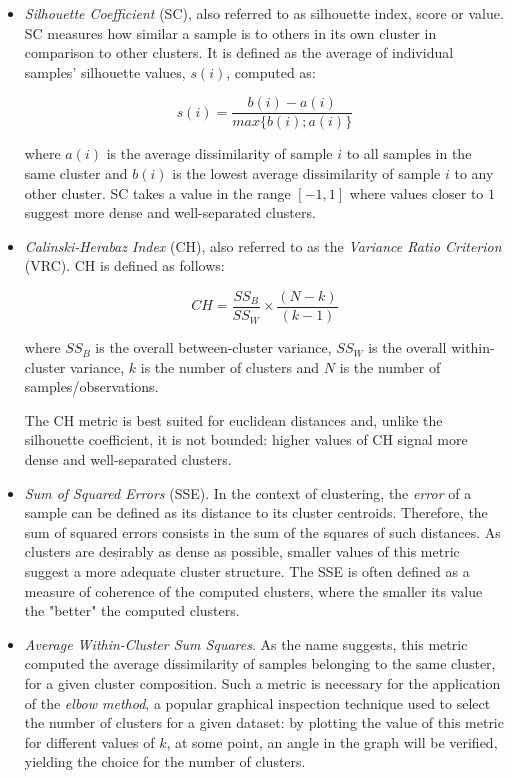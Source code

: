 \documentclass[9pt,journal,compsoc]{IEEEtran}
\begin{document}
\begin{itemize}
	\item \emph{Silhouette Coefficient} (SC), also referred to as silhouette index, score or value. SC measures how similar a sample is to others in its own cluster in comparison to other clusters. It is defined as the average of individual samples' silhouette values, $s(i)$, computed as:
	
	$$s(i) = \frac{b(i) - a(i)}{max\{b(i); a(i)\}} $$
	
	where $a(i)$ is the average dissimilarity of sample $i$ to all samples in the same cluster and $b(i)$ is the lowest average dissimilarity of sample $i$ to any other cluster. SC takes a value in the range $[-1, 1]$ where values closer to $1$ suggest more dense and well-separated clusters.
	
	\vspace{0.3cm}
	
	\item \emph{Calinski-Herabaz Index} (CH), also referred to as the \emph{Variance Ratio Criterion} (VRC). CH is defined as follows:
	
	$$CH = \frac{SS_{B}}{SS_{W}} \times \frac{(N - k)}{(k - 1)}$$
	
	where $SS_{B}$ is the overall between-cluster variance, $SS_{W}$ is the overall within-cluster variance, $k$ is the number of clusters and $N$ is the number of samples/observations.
	
	The CH metric is best suited for euclidean distances and, unlike the silhouette coefficient, it is not bounded: higher values of CH signal more dense and well-separated clusters.
	
	\vspace{0.3cm}
	
	\item \emph{Sum of Squared Errors} (SSE). In the context of clustering, the \emph{error} of a sample can be defined as its distance to its cluster centroids. Therefore, the sum of squared errors consists in the sum of the squares of such distances. As clusters are desirably as dense as possible, smaller values of this metric suggest a more adequate cluster structure. The SSE is often defined as a measure of coherence of the computed clusters, where the smaller its value the "better" the computed clusters.

	\vspace{0.3cm}	
	
	\item \emph{Average Within-Cluster Sum Squares}. As the name suggests, this metric computed the average dissimilarity of samples belonging to the same cluster, for a given cluster composition. Such a metric is necessary for the application of the \emph{elbow method}, a popular graphical inspection technique used to select the number of clusters for a given dataset: by plotting the value of this metric for different values of $k$, at some point, an angle in the graph will be verified, yielding the choice for the number of clusters.
	
\end{itemize}
\end{document}
